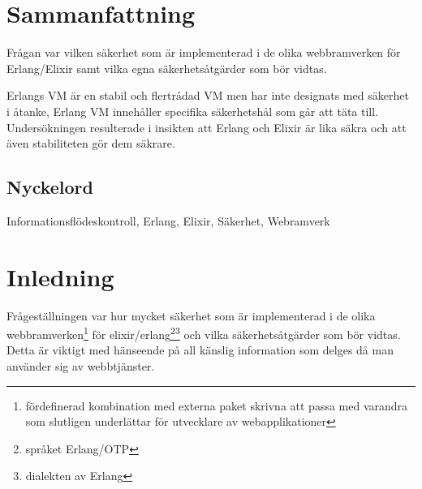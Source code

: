 \documentclass[12pt]{article}
\begin{document}
\maketitle

	 	 	 	 	
	
\section*{Sammanfattning}
Frågan var vilken säkerhet som är implementerad i de olika webbramverken för Erlang/Elixir samt vilka egna säkerhetsåtgärder som bör vidtas.

Erlangs VM är en stabil och flertrådad VM men har inte designats med säkerhet i åtanke, Erlang VM innehåller specifika säkerhetshål som går att täta till.
Undersökningen resulterade i insikten att Erlang och Elixir är lika säkra och att även stabiliteten gör dem säkrare.
\subsection*{Nyckelord}
Informationsflödeskontroll, Erlang, Elixir, Säkerhet, Webramverk
	
\section{Inledning}

Frågeställningen var hur mycket säkerhet som är implementerad i de olika webbramverken\footnote{fördefinerad kombination med externa paket skrivna att passa med varandra som slutligen underlättar för utvecklare av webapplikationer} för elixir/erlang\footnote{språket Erlang/OTP\cite{erlang}}\footnote{dialekten av Erlang\cite{elixir}} och vilka säkerhetsåtgärder som bör vidtas.
Detta är viktigt med hänseende på all känslig information som delges då man använder sig av webbtjänster.
\end{document}
